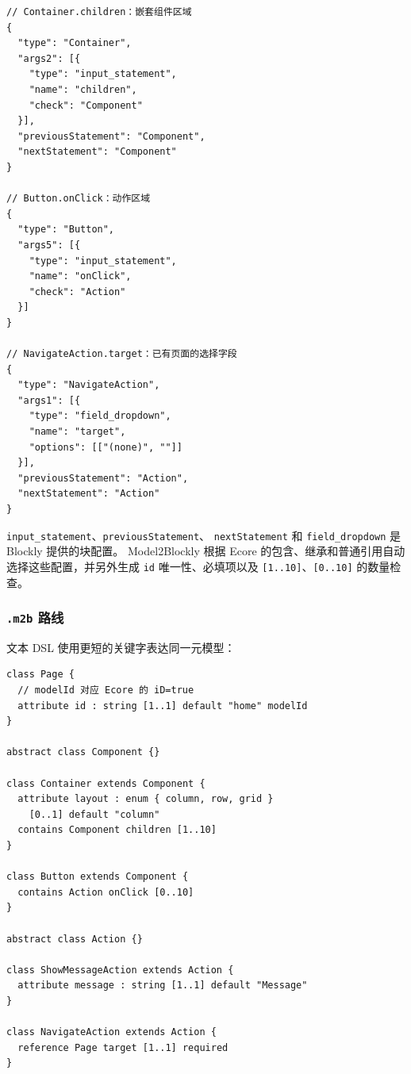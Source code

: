 \begin{lstlisting}[style=tfmcode, captionpos=t,
caption={Ecore 路线生成的主要 Blockly 配置},
label={lst:interactive-app-blockly}]
// Container.children：嵌套组件区域
{
  "type": "Container",
  "args2": [{
    "type": "input_statement",
    "name": "children",
    "check": "Component"
  }],
  "previousStatement": "Component",
  "nextStatement": "Component"
}

// Button.onClick：动作区域
{
  "type": "Button",
  "args5": [{
    "type": "input_statement",
    "name": "onClick",
    "check": "Action"
  }]
}

// NavigateAction.target：已有页面的选择字段
{
  "type": "NavigateAction",
  "args1": [{
    "type": "field_dropdown",
    "name": "target",
    "options": [["(none)", ""]]
  }],
  "previousStatement": "Action",
  "nextStatement": "Action"
}
\end{lstlisting}

\texttt{input\_statement}、\texttt{previousStatement}、
\texttt{nextStatement} 和 \texttt{field\_dropdown} 是 Blockly 提供的块配置。
Model2Blockly 根据 Ecore 的包含、继承和普通引用自动选择这些配置，并另外生成
\texttt{id} 唯一性、必填项以及 \texttt{[1..10]}、\texttt{[0..10]} 的数量检查。

\subsubsection{\texttt{.m2b} 路线}

文本 DSL 使用更短的关键字表达同一元模型：

\begin{lstlisting}[style=tfmm2b, captionpos=t,
caption={新增模型能力的 \texttt{.m2b} 定义},
label={lst:interactive-app-m2b}]
class Page {
  // modelId 对应 Ecore 的 iD=true
  attribute id : string [1..1] default "home" modelId
}

abstract class Component {}

class Container extends Component {
  attribute layout : enum { column, row, grid }
    [0..1] default "column"
  contains Component children [1..10]
}

class Button extends Component {
  contains Action onClick [0..10]
}

abstract class Action {}

class ShowMessageAction extends Action {
  attribute message : string [1..1] default "Message"
}

class NavigateAction extends Action {
  reference Page target [1..1] required
}
\end{lstlisting}

